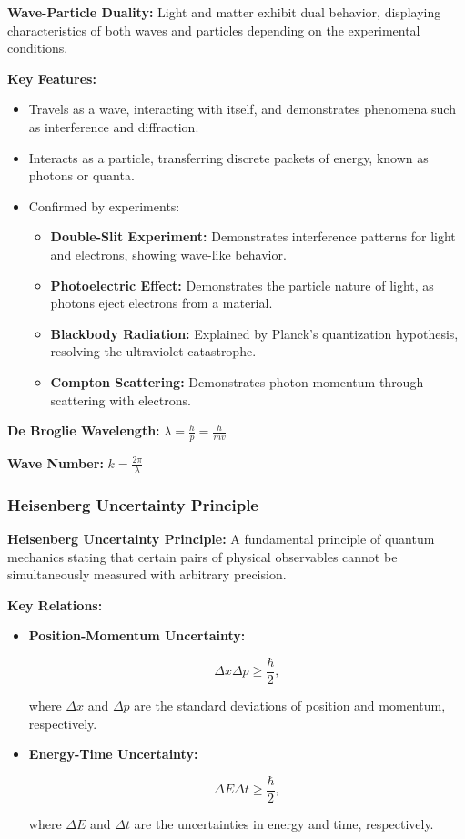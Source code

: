 \documentclass{article}
\newcommand{\eqbox}[1]{\begin{tcolorbox}[colback=gray!10] #1 \end{tcolorbox}}
\newcommand{\conceptbox}[1]{\begin{tcolorbox}[colback=blue!10] #1 \end{tcolorbox}}
\begin{document}
\conceptbox{
\textbf{Wave-Particle Duality:}
Light and matter exhibit dual behavior, displaying characteristics of both waves and particles depending on the experimental conditions.
}
\conceptbox{
\textbf{Key Features:}
\begin{itemize}
    \item Travels as a wave, interacting with itself, and demonstrates phenomena such as interference and diffraction.
    \item Interacts as a particle, transferring discrete packets of energy, known as photons or quanta.
    \item Confirmed by experiments:
    \begin{itemize}
        \item \textbf{Double-Slit Experiment:} Demonstrates interference patterns for light and electrons, showing wave-like behavior.
        \item \textbf{Photoelectric Effect:} Demonstrates the particle nature of light, as photons eject electrons from a material.
        \item \textbf{Blackbody Radiation:} Explained by Planck's quantization hypothesis, resolving the ultraviolet catastrophe.
        \item \textbf{Compton Scattering:} Demonstrates photon momentum through scattering with electrons.
    \end{itemize}
\end{itemize}
\eqbox{
\textbf{De Broglie Wavelength:} \( \lambda = \displaystyle\frac{h}{p} = \displaystyle\frac{h}{mv} \)
}

\eqbox{
\textbf{Wave Number:} \( k = \displaystyle\frac{2\pi}{\lambda} \)
}
}

\subsubsection{Heisenberg Uncertainty Principle}

\conceptbox{
\textbf{Heisenberg Uncertainty Principle:}
A fundamental principle of quantum mechanics stating that certain pairs of physical observables cannot be simultaneously measured with arbitrary precision.
}

\conceptbox{
\textbf{Key Relations:}
\begin{itemize}
    \item \textbf{Position-Momentum Uncertainty:}
    \eqbox{
    \[
    \Delta x \Delta p \geq \frac{\hbar}{2},
    \]
    }
    where \( \Delta x \) and \( \Delta p \) are the standard deviations of position and momentum, respectively.
    \item \textbf{Energy-Time Uncertainty:}
    \eqbox{
    \[
    \Delta E \Delta t \geq \frac{\hbar}{2},
    \]
    }
    where \( \Delta E \) and \( \Delta t \) are the uncertainties in energy and time, respectively.
\end{itemize}
}
\end{document}
